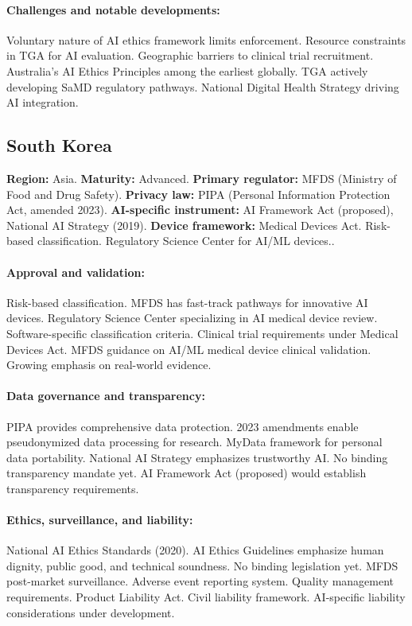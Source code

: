 {\paragraph{Challenges and notable developments:}
Voluntary nature of AI ethics framework limits enforcement. Resource constraints in TGA for AI evaluation. Geographic barriers to clinical trial recruitment.
Australia's AI Ethics Principles among the earliest globally. TGA actively developing SaMD regulatory pathways. National Digital Health Strategy driving AI integration.


\subsection{South Korea}
\textbf{Region:} Asia.
\textbf{Maturity:} Advanced.
\textbf{Primary regulator:} MFDS (Ministry of Food and Drug Safety).
\textbf{Privacy law:} PIPA (Personal Information Protection Act, amended 2023).
\textbf{AI-specific instrument:} AI Framework Act (proposed), National AI Strategy (2019).
\textbf{Device framework:} Medical Devices Act. Risk-based classification. Regulatory Science Center for AI/ML devices..

\paragraph{Approval and validation:}
Risk-based classification. MFDS has fast-track pathways for innovative AI devices. Regulatory Science Center specializing in AI medical device review. Software-specific classification criteria.
Clinical trial requirements under Medical Devices Act. MFDS guidance on AI/ML medical device clinical validation. Growing emphasis on real-world evidence.

\paragraph{Data governance and transparency:}
PIPA provides comprehensive data protection. 2023 amendments enable pseudonymized data processing for research. MyData framework for personal data portability.
National AI Strategy emphasizes trustworthy AI. No binding transparency mandate yet. AI Framework Act (proposed) would establish transparency requirements.

\paragraph{Ethics, surveillance, and liability:}
National AI Ethics Standards (2020). AI Ethics Guidelines emphasize human dignity, public good, and technical soundness. No binding legislation yet.
MFDS post-market surveillance. Adverse event reporting system. Quality management requirements.
Product Liability Act. Civil liability framework. AI-specific liability considerations under development.

}
